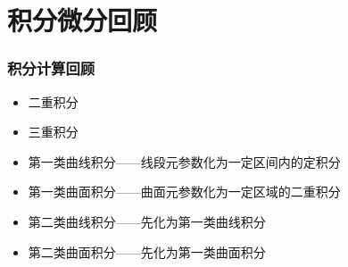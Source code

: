 \documentclass[10pt]{beamer}
\begin{document}
\section{积分微分回顾}
\begin{frame}
    \frametitle{ 积分计算回顾}
    \begin{itemize}
        \item 二重积分
        \item 三重积分
        \item 第一类曲线积分——线段元参数化为一定区间内的定积分
        \item 第一类曲面积分——曲面元参数化为一定区域的二重积分
        \item 第二类曲线积分——先化为第一类曲线积分
        \item 第二类曲面积分——先化为第一类曲面积分
    \end{itemize}
\end{frame}
\end{document}
